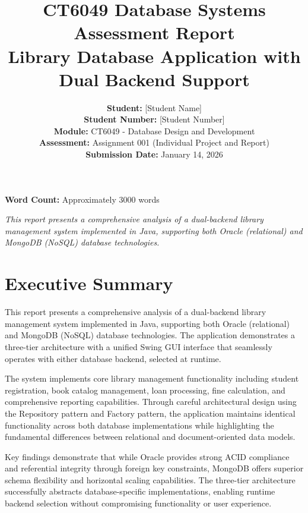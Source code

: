 \documentclass[12pt,a4paper]{article}
\title{
    \vspace{-2cm}
    \Large\textbf{CT6049 Database Systems Assessment Report}\\
    \large Library Database Application with Dual Backend Support
}
\author{
    \textbf{Student:} [Student Name]\\
    \textbf{Student Number:} [Student Number]\\
    \textbf{Module:} CT6049 - Database Design and Development\\
    \textbf{Assessment:} Assignment 001 (Individual Project and Report)\\
    \textbf{Submission Date:} January 14, 2026
}
\date{}
\begin{document}
\maketitle
\thispagestyle{empty}

\vspace{2cm}

\begin{center}
\textbf{Word Count:} Approximately 3000 words
\end{center}

\vfill

\begin{center}
\textit{This report presents a comprehensive analysis of a dual-backend library management system implemented in Java, supporting both Oracle (relational) and MongoDB (NoSQL) database technologies.}
\end{center}

\newpage

\tableofcontents
\newpage

\section{Executive Summary}

This report presents a comprehensive analysis of a dual-backend library management system implemented in Java, supporting both Oracle (relational) and MongoDB (NoSQL) database technologies. The application demonstrates a three-tier architecture with a unified Swing GUI interface that seamlessly operates with either database backend, selected at runtime.

The system implements core library management functionality including student registration, book catalog management, loan processing, fine calculation, and comprehensive reporting capabilities. Through careful architectural design using the Repository pattern and Factory pattern, the application maintains identical functionality across both database implementations while highlighting the fundamental differences between relational and document-oriented data models.

Key findings demonstrate that while Oracle provides strong ACID compliance and referential integrity through foreign key constraints, MongoDB offers superior schema flexibility and horizontal scaling capabilities. The three-tier architecture successfully abstracts database-specific implementations, enabling runtime backend selection without compromising functionality or user experience.
\end{document}
